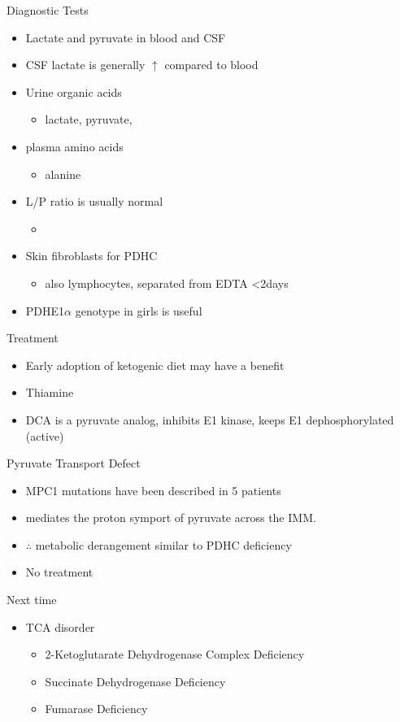 \documentclass[presentation, smaller]{beamer}
\begin{document}
\begin{frame}[label={sec:org3dca4e9}]{Diagnostic Tests}
\begin{itemize}
\item Lactate and pyruvate in blood and CSF
\item CSF lactate is generally \(\uparrow\) compared to blood
\item Urine organic acids
\begin{itemize}
\item lactate, pyruvate,
\end{itemize}
\item plasma amino acids
\begin{itemize}
\item alanine
\end{itemize}
\item L/P ratio is usually normal
\begin{itemize}
\item 
\end{itemize}

\item Skin fibroblasts for PDHC

\begin{itemize}
\item also lymphocytes, separated from EDTA <2days
\end{itemize}

\item PDHE1\(\alpha\) genotype in girls is useful
\end{itemize}
\end{frame}
\begin{frame}[label={sec:org269954e}]{Treatment}
\begin{itemize}
\item Early adoption of ketogenic diet may have a benefit
\item Thiamine
\item DCA is a pyruvate analog, inhibits E1 kinase, keeps E1 dephosphorylated (active)
\end{itemize}
\end{frame}

\begin{frame}[label={sec:org74fce1c}]{Pyruvate Transport Defect}
\begin{itemize}
\item MPC1 mutations have been described in 5 patients
\item mediates the proton symport of pyruvate across the IMM.
\item \(\therefore\) metabolic derangement similar to PDHC deficiency

\item No treatment
\end{itemize}
\end{frame}

\begin{frame}[label={sec:orgd1d05f8}]{Next time}
\begin{itemize}
\item TCA disorder
\begin{itemize}
\item 2-Ketoglutarate Dehydrogenase Complex Deficiency
\item Succinate Dehydrogenase Deficiency
\item Fumarase Deficiency
\end{itemize}
\end{itemize}
\end{frame}
\end{document}
